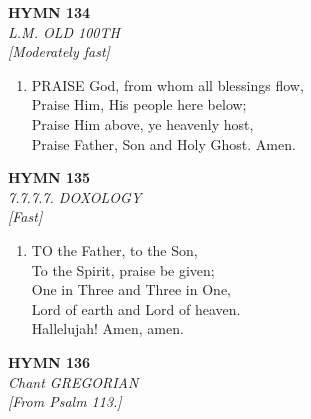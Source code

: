 \newpage
\begin{center}
    {\Large \textbf{HYMN 134}}
    \\
    \textit{L.M. OLD 100TH}
    \\
    \textit{\small [Moderately fast]}
\end{center}
\vspace{1em}

\begin{enumerate}
    \item PRAISE God, from whom all blessings flow, \\
        Praise Him, His people here below; \\
        Praise Him above, ye heavenly host, \\
        Praise Father, Son and Holy Ghost. Amen.

\end{enumerate}

\newpage
\begin{center}
    {\Large \textbf{HYMN 135}}
    \\
    \textit{7.7.7.7. DOXOLOGY}
    \\
    \textit{\small [Fast]}
\end{center}
\vspace{1em}

\begin{enumerate}
    \item TO the Father, to the Son, \\
        To the Spirit, praise be given; \\
        One in Three and Three in One, \\
        Lord of earth and Lord of heaven. \\
        Hallelujah! Amen, amen.

\end{enumerate}

\newpage
\begin{center}
    {\Large \textbf{HYMN 136}}
    \\
    \textit{Chant GREGORIAN}
    \\
    \textit{\small [From Psalm 113.]}
\end{center}
\vspace{1em}

